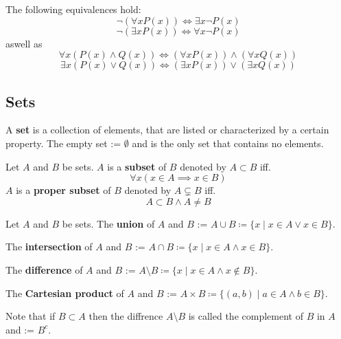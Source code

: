 \begin{theorem}
    The following equivalences hold:
    $$\neg (\forall x P(x)) \iff \exists x \neg P(x)$$
    $$\neg (\exists x P(x)) \iff \forall x \neg P(x)$$
    aswell as
    $$\forall x (P(x) \land Q(x)) \iff (\forall x P(x)) \land (\forall x Q(x))$$
    $$\exists x (P(x) \lor Q(x)) \iff (\exists x P(x)) \lor (\exists x Q(x))$$
\end{theorem}

\subsection{Sets}

\begin{definition}
    A \textbf{set} is a collection of elements, that are listed or characterized by a certain property. 
    The empty set := $\emptyset$ and is the only set that contains no elements.
\end{definition}

\begin{definition}
    Let $A$ and $B$ be sets. $A$ is a \textbf{subset} of $B$ denoted by $A \subset B$ iff. 
    $$\forall x (x \in A \implies x \in B)$$
    $A$ is a \textbf{proper subset} of $B$ denoted by $A \subsetneq B$ iff. 
    $$A \subset B \land A \neq B$$
\end{definition}

\begin{definition}
    Let $A$ and $B$ be sets.
    The \textbf{union} of $A$ and $B$ := $A \cup B \coloneqq \{x \mid x \in A \lor x \in B\}$.
\end{definition}

\begin{definition}
    The \textbf{intersection} of $A$ and $B$ := $A \cap B \coloneqq \{x \mid x \in A \land x \in B\}$.
\end{definition}

\begin{definition}
    The \textbf{difference} of $A$ and $B$ := $A \setminus B \coloneqq \{x \mid x \in A \land x \notin B\}$.
\end{definition}

\begin{definition}
    The \textbf{Cartesian product} of $A$ and $B$ := $A \times B \coloneqq \{(a, b) \mid a \in A \land b \in B\}$.
\end{definition}

\begin{remark}
    Note that if $B \subset A$ then the diffrence $A \setminus B$ is called the complement of $B$ in $A$ and := $B^c$.
\end{remark}

